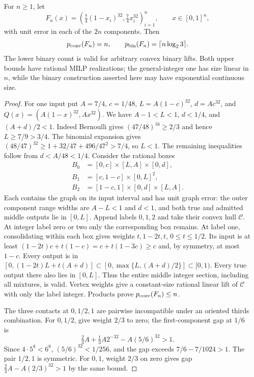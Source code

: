 \begin{theorem}\label{thm:exact-box-gap}
For $n\ge1$, let
\[
 F_n(x)=\left(\tfrac74(1-x_i)^{32},\tfrac74x_i^{32}\right)_{i=1}^n,
 \qquad x\in[0,1]^n,
\]
with unit error in each of the $2n$ components. Then
\begin{equation}\label{eq:exact-box-counts}
 p_{\mathrm{conv}}(F_n)=n,\qquad p_{\mathrm{bin}}(F_n)=\lceil n\log_2 3\rceil.
\end{equation}
The lower binary count is valid for arbitrary convex binary lifts.
Both upper bounds have rational MILP realizations; the general-integer
one has size linear in $n$, while the binary construction asserted here
may have exponential continuous size.
\end{theorem}
\begin{proof}
For one input put $A=7/4$, $c=1/48$, $L=A(1-c)^{32}$,
$d=Ac^{32}$, and $Q(x)=(A(1-x)^{32},Ax^{32})$.
We have $A-1<L<1$, $d<1/4$, and $(A+d)/2<1$.
Indeed Bernoulli gives $(47/48)^{16}\ge2/3$ and hence
$L\ge7/9>3/4$. The binomial expansion gives
$(48/47)^{32}\ge1+32/47+496/47^2>7/4$, so $L<1$.
The remaining inequalities follow from $d<A/48<1/4$.
Consider the rational boxes
\begin{align*}
 B_0&=[0,c]\times[L,A]\times[0,d],\\
 B_1&=[c,1-c]\times[0,L]^2,\\
 B_2&=[1-c,1]\times[0,d]\times[L,A].
\end{align*}
Each contains the graph on its input interval and has unit graph error:
the outer component range widths are $A-L<1$ and $d<1$, and both
true and admitted middle outputs lie in $[0,L]$.
Append labels $0,1,2$ and take their convex hull $\mathcal C$.
At integer label zero or two only the corresponding box remains.
At label one, consolidating within each box gives weights
$t,1-2t,t$, $0\le t\le1/2$. Its input is at least
$(1-2t)c+t(1-c)=c+t(1-3c)\ge c$ and, by symmetry, at most $1-c$.
Every output is in
$[0,(1-2t)L+t(A+d)]\subset[0,\max\{L,(A+d)/2\}]\subset[0,1)$.
Every true output there also lies in $[0,L]$. Thus the entire middle
integer section, including all mixtures, is valid. Vertex weights give
a constant-size rational linear lift of $\mathcal C$ with only the
label integer. Products prove $p_{\mathrm{conv}}(F_n)\le n$.

The three contacts at $0,1/2,1$ are pairwise incompatible under an
oriented thirds combination. For $0,1/2$, give weight $2/3$ to zero;
the first-component gap at $1/6$ is
\[
 \tfrac23A+\tfrac13A2^{-32}-A(5/6)^{32}>1.
\]
Since $4\cdot5^8<6^8$, $(5/6)^{32}<1/256$, and the gap exceeds
$7/6-7/1024>1$. The pair $1/2,1$ is symmetric. For $0,1$, weight
$2/3$ on zero gives gap $\tfrac23A-A(2/3)^{32}>1$ by the same bound.


\end{proof}

